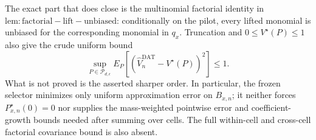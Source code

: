 The exact part that does close is the multinomial factorial identity in \(\mathrm{lem:factorial-lift-unbiased}\): conditionally on the pilot, every lifted monomial is unbiased for the corresponding monomial in \(q_x\).  Truncation and \(0\le V^\star(P)\le1\) also give the crude uniform bound
\[
 \sup_{P\in\mathcal P_{d,\epsilon}}E_P[(\widehat V_n^{\mathrm{DAT}}-V^\star(P))^2]\le1.
\]
What is not proved is the asserted sharper order.  In particular, the frozen selector minimizes only uniform approximation error on \(B_{x,n}\); it neither forces \(P^\star_{x,n}(0)=0\) nor supplies the mass-weighted pointwise error and coefficient-growth bounds needed after summing over cells.  The full within-cell and cross-cell factorial covariance bound is also absent.